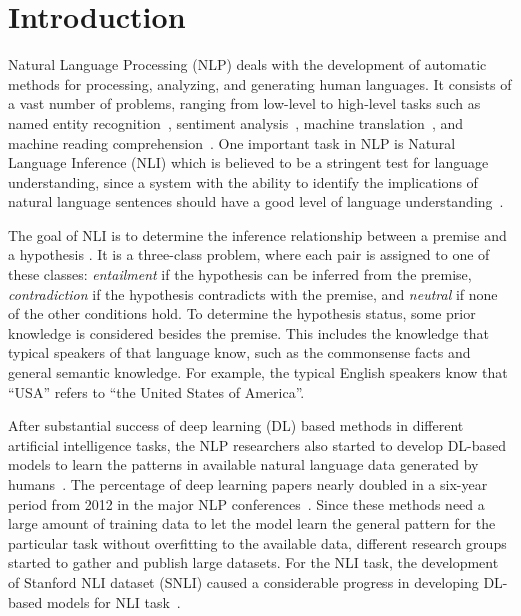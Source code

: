 \documentclass[preprint,12pt]{elsarticle}
\begin{document}
\section{Introduction}
\label{sec:introduction}
Natural Language Processing (NLP) deals with the development of automatic methods for processing, analyzing, and generating human languages. It consists of a vast number of problems, ranging from low-level to high-level tasks such as named entity recognition~\citep{yadav2019survey}, sentiment analysis~\citep{keramatfar2019bibliometrics}, machine translation~\citep{yang2020survey}, and machine reading comprehension~\citep{baradaran2020survey}. One important task in NLP is Natural Language Inference (NLI) which is believed to be a stringent test for language understanding, since a system with the ability to identify the implications of natural language sentences should have a good level of language understanding~\citep{maccartney2009natural}.

The goal of NLI is to determine the inference relationship between a premise  and a hypothesis . It is a three-class problem, where each pair  is assigned to one of these classes: \textit{entailment} if the hypothesis can be inferred from the premise, \textit{contradiction} if the hypothesis contradicts with the premise, and \textit{neutral} if none of the other conditions hold. To determine the hypothesis status, some prior knowledge is considered besides the premise. This includes the knowledge that typical speakers of that language know, such as the commonsense facts and general semantic knowledge. For example, the typical English speakers know that “USA” refers to “the United States of America”.

After substantial success of deep learning (DL) based methods in different artificial intelligence tasks, the NLP researchers also started to develop DL-based models to learn the patterns in available natural language data generated by humans~\citep{otter2020survey}.  The percentage of deep learning papers nearly doubled in a six-year period from 2012 in the major NLP conferences~\citep{young2018recent}. Since these methods need a large amount of training data to let the model learn the general pattern for the particular task without overfitting to the available data, different research groups started to gather and publish large datasets. For the NLI task, the development of Stanford NLI dataset (SNLI) caused a considerable progress in developing DL-based models for NLI task~\citep{bowman2015large}.
\end{document}
